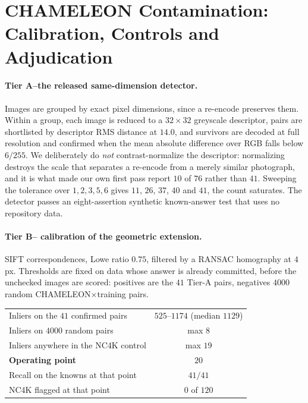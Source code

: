\documentclass{article}
\begin{document}
\clearpage


\section{CHAMELEON Contamination: Calibration, Controls and Adjudication}
\label{app:chamext}

\paragraph{Tier A--the released same-dimension detector.} Images are grouped by exact pixel
dimensions, since a re-encode preserves them. Within a group, each image is reduced to a
$32\times32$ greyscale descriptor, pairs are shortlisted by descriptor RMS distance at $14.0$, and
survivors are decoded at full resolution and confirmed when the mean absolute difference over RGB
falls below $6/255$. We deliberately do \emph{not} contrast-normalize the descriptor: normalizing
destroys the scale that separates a re-encode from a merely similar photograph, and it is what made
our own first pass report $10$ of $76$ rather than $41$. Sweeping the tolerance over
$1, 2, 3, 5, 6$ gives $11$, $26$, $37$, $40$ and $41$, the count saturates. The detector passes an
eight-assertion synthetic known-answer test that uses no repository data.

\paragraph{Tier B-- calibration of the geometric extension.} SIFT correspondences, Lowe ratio
$0.75$, filtered by a RANSAC homography at $4$ px. Thresholds are fixed on data whose answer is
already committed, before the unchecked images are scored: positives are the $41$ Tier-A pairs,
negatives $4000$ random CHAMELEON$\times$training pairs.

\begin{center}\small
\begin{tabular}{lc}
\toprule
Inliers on the $41$ confirmed pairs & $525$--$1174$ (median $1129$) \\
Inliers on $4000$ random pairs & max $8$ \\
Inliers anywhere in the NC4K control & max $19$ \\
\textbf{Operating point} & \textbf{$20$} \\
Recall on the knowns at that point & $41/41$ \\
NC4K flagged at that point & $0$ of $120$ \\
\bottomrule
\end{tabular}
\end{center}
\end{document}
